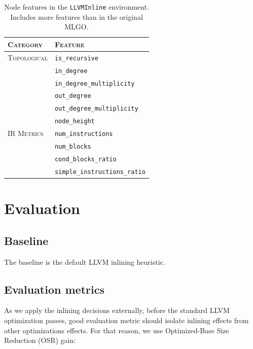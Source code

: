 \documentclass{article}
\theoremstyle{plain}
\theoremstyle{definition}
\theoremstyle{remark}
\begin{document}
\begin{table}[t]
\vskip 0.15in
\begin{center}
\begin{scriptsize}
\begin{tabular}{ll}
\toprule
\textsc{Category} & \textsc{Feature} \\
\midrule
\textsc{Topological} & \texttt{is\_recursive} \\
                     & \texttt{in\_degree} \\
                     & \texttt{in\_degree\_multiplicity} \\
                     & \texttt{out\_degree} \\
                     & \texttt{out\_degree\_multiplicity} \\
                     & \texttt{node\_height} \\
\midrule
\textsc{IR Metrics}  & \texttt{num\_instructions} \\
                     & \texttt{num\_blocks} \\
                     & \texttt{cond\_blocks\_ratio} \\
                     & \texttt{simple\_instructions\_ratio} \\
\bottomrule
\end{tabular}
\end{scriptsize}
\end{center}
\vskip -0.1in

\caption{Node features in the \texttt{LLVMInline} environment. Includes more features than in the original MLGO.}
\label{tab:node-features}

\end{table}

\section{Evaluation}

\subsection{Baseline}

The baseline is the default LLVM inlining heuristic.

\subsection{Evaluation metrics}

As we apply the inlining decisions externally, before the standard LLVM optimization passes, good evaluation metric should isolate inlining effects from other optimizations effects. For that reason, we use Optimized-Base Size Reduction (OSR) gain:
\end{document}
